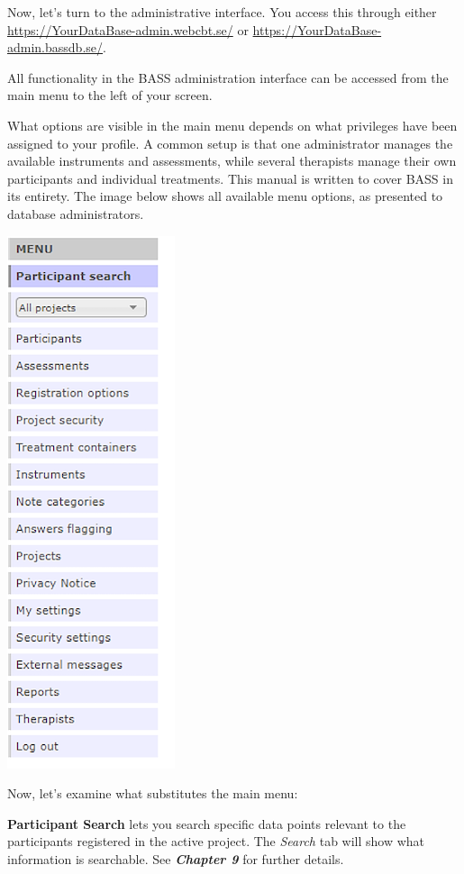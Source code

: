 \documentclass[
]{book}
\begin{document}
Now, let's turn to the administrative interface. You access this through either \url{https://YourDataBase-admin.webcbt.se/} or \url{https://YourDataBase-admin.bassdb.se/}.

All functionality in the BASS administration interface can be accessed from the main menu to the left of your screen.

What options are visible in the main menu depends on what privileges have been assigned to your profile. A common setup is that one administrator manages the available instruments and assessments, while several therapists manage their own participants and individual treatments. This manual is written to cover BASS in its entirety. The image below shows all available menu options, as presented to database administrators.

\includegraphics{images/main-menu.png}

Now, let's examine what substitutes the main menu:

\textbf{Participant Search} lets you search specific data points relevant to the participants registered in the active project. The \emph{Search} tab will show what information is searchable. See \textbf{\emph{Chapter 9}} for further details.
\end{document}
